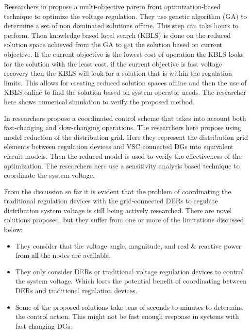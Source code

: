 \documentclass[Journal]{IEEEtran}
\begin{document}
Researchers in \cite{NLR_9} propose a multi-objective pareto front optimization-based technique to optimize the voltage regulation. They use genetic algorithm (GA) to determine a set of non dominated solutions offline. This step can take hours to perform. Then knowledge based local search (KBLS) is done on the reduced solution space achieved from the GA to get the solution based on current objective. If the current objective is the lowest cost of operation the KBLS looks for the solution with the least cost. if the current objective is fast voltage recovery then the KBLS will look for a solution that is within the regulation limits. This allows for creating reduced solution spaces offline and then the use of KBLS online to find the solution based on system operator needs. The researcher here shows numerical simulation to verify the proposed method.

In \cite{NLR_10} researchers propose a coordinated control scheme that takes into account both fast-changing and slow-changing operations. The researchers here propose using model reduction of the distribution grid. Here they represent the distribution grid elements between regulation devices and VSC connected DGs into equivalent circuit models. Then the reduced model is used to verify the effectiveness of the optimization. The researchers here use a sensitivity analysis based technique to coordinate the system voltage.

From the discussion so far it is evident that the problem of coordinating the traditional regulation devices with the grid-connected DERs to regulate distribution system voltage is still being actively researched. There are novel solutions proposed, but they suffer from one or more of the limitations discussed below:
\begin{itemize}
    \item They consider that the voltage angle, magnitude, and real \& reactive power from all the nodes are available.
    \item They only consider DERs or traditional voltage regulation devices to control the system voltage. Which loses the potential benefit of coordinating between DERs and traditional regulation devices.
    \item Some of the proposed solutions take tens of seconds to minutes to determine the control action. This might not be fast enough response in systems with fast-changing DGs.
\end{itemize}
\end{document}
